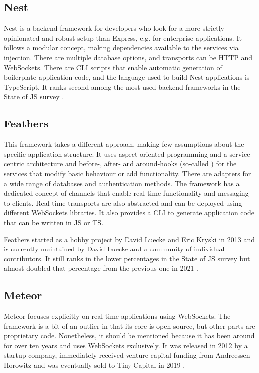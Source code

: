 

\subsection{Nest}

Nest is a backend framework for developers who look for a more strictly opinionated and robust setup than Express, e.g. for enterprise applications. It follows a modular concept, making dependencies available to the services via injection. There are multiple database options, and transports can be HTTP and WebSockets. There are \ac{CLI} scripts that enable automatic generation of boilerplate application code, and the language used to build Nest applications is TypeScript. It ranks second among the most-used backend frameworks in the State of JS survey \parencite{mostUsedBackendFrameworks22}.

\subsection{Feathers}

This framework takes a different approach, making few assumptions about the specific application structure. It uses aspect-oriented programming and a service-centric architecture and before-, after- and around-hooks (so-called ) for the services that modify basic behaviour or add functionality. There are adapters for a wide range of databases and authentication methods. The framework has a dedicated concept of channels that enable real-time functionality and messaging to clients. Real-time transports are also abstracted and can be deployed using different WebSockets libraries. It also provides a \ac{CLI} to generate application code that can be written in \ac{JS} or \ac{TS}.

Feathers started as a hobby project by David Luecke and Eric Kryski in 2013 \parencite{feathersFrameworkHistory} and is currently maintained by David Luecke and a community of individual contributors. It still ranks in the lower percentages in the State of JS survey but almost doubled that percentage from the previous one in 2021 \parencite{mostUsedBackendFrameworks21}.

\subsection{Meteor}

Meteor focuses explicitly on real-time applications using WebSockets. The framework is a bit of an outlier in that its core is open-source, but other parts are proprietary code. Nonetheless, it should be mentioned because it has been around for over ten years and uses WebSockets exclusively. It was released in 2012 by a startup company, immediately received venture capital funding from Andreessen Horowitz and was eventually sold to Tiny Capital in 2019 \parencite{meteorSaleTinyCapital}.

